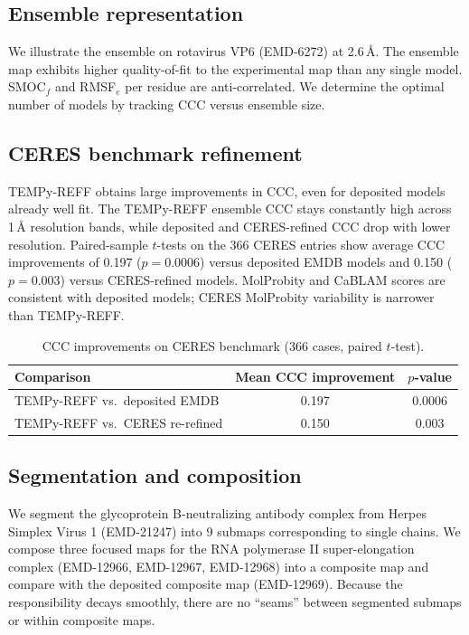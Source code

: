 \documentclass[11pt]{article}
\begin{document}
\subsection{Ensemble representation}
We illustrate the ensemble on rotavirus VP6 (EMD-6272) at 2.6\,\AA{}. The ensemble map exhibits higher quality-of-fit to the experimental map than any single model. SMOC$_f$ and RMSF$_e$ per residue are anti-correlated. We determine the optimal number of models by tracking CCC versus ensemble size.

\subsection{CERES benchmark refinement}
TEMPy-REFF obtains large improvements in CCC, even for deposited models already well fit. The TEMPy-REFF ensemble CCC stays constantly high across 1\,\AA{} resolution bands, while deposited and CERES-refined CCC drop with lower resolution. Paired-sample $t$-tests on the 366 CERES entries show average CCC improvements of 0.197 ($p=0.0006$) versus deposited EMDB models and 0.150 ($p=0.003$) versus CERES-refined models. MolProbity and CaBLAM scores are consistent with deposited models; CERES MolProbity variability is narrower than TEMPy-REFF.

\begin{table}[h]
\centering
\caption{CCC improvements on CERES benchmark (366 cases, paired $t$-test).}
\begin{tabular}{lcc}
\toprule
Comparison & Mean CCC improvement & $p$-value \\
\midrule
TEMPy-REFF vs.\ deposited EMDB & 0.197 & 0.0006 \\
TEMPy-REFF vs.\ CERES re-refined & 0.150 & 0.003 \\
\bottomrule
\end{tabular}
\end{table}

\subsection{Segmentation and composition}
We segment the glycoprotein B-neutralizing antibody complex from Herpes Simplex Virus 1 (EMD-21247) into 9 submaps corresponding to single chains. We compose three focused maps for the RNA polymerase II super-elongation complex (EMD-12966, EMD-12967, EMD-12968) into a composite map and compare with the deposited composite map (EMD-12969). Because the responsibility decays smoothly, there are no ``seams'' between segmented submaps or within composite maps.
\end{document}
